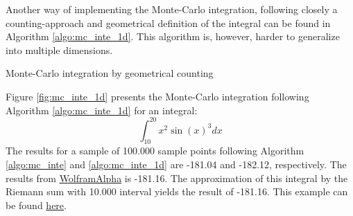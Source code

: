 Another way of implementing the Monte-Carlo integration, following closely a counting-approach and geometrical definition of the integral can be found in Algorithm \ref{algo:mc_inte_1d}. This algorithm is, however, harder to generalize into multiple dimensions. 

\vspace{\baselineskip}
\begin{algorithm}[H]
\caption{Monte-Carlo integration by geometrical counting}
\label{algo:mc_inte_1d}  
\end{algorithm}
\vspace{\baselineskip}

Figure \ref{fig:mc_inte_1d} presents the Monte-Carlo integration following Algorithm \ref{algo:mc_inte_1d} for an integral:
\begin{equation}
	\int_{10}^{20} x^2 \sin(x)^3 dx
\end{equation}
The results for a sample of 100.000 sample points following Algorithm \ref{algo:mc_inte} and \ref{algo:mc_inte_1d} are -181.04 and -182.12, respectively. The results from \href{https://www.wolframalpha.com/input/?i=integrate+x^2+sin^3+x+dx+from+10+to+20}{WolframAlpha} is -181.16. The approximation of this integral by the Riemann sum with 10.000 interval yields the result of -181.16. This example can be found \href{https://github.com/chitn/quantfin_study/blob/master/integration.py}{here}.


